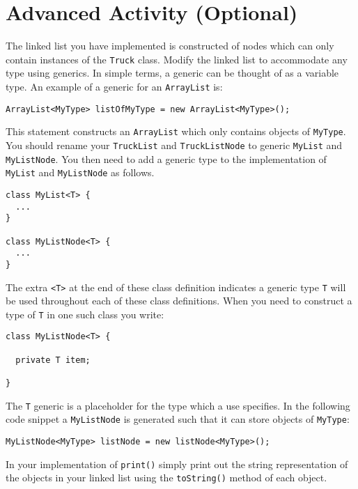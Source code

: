 \documentclass[12pt]{scrartcl}
\begin{document}
\section*{Advanced Activity (Optional)}

The linked list you have implemented is constructed of nodes which 
can only contain instances of the \texttt{Truck} class. 
Modify the linked list to accommodate any type using generics. In 
simple terms, a generic can be thought of as a variable type. An 
example of a generic for an \texttt{ArrayList} is:

\texttt{ArrayList<MyType> listOfMyType = new ArrayList<MyType>();}

This statement constructs an \texttt{ArrayList} which 
only contains objects of \texttt{MyType}. You should 
rename your \texttt{TruckList} and \texttt{TruckListNode} 
to generic \texttt{MyList} and \texttt{MyListNode}.  
You then need to add a generic type to the implementation of 
\texttt{MyList} and \texttt{MyListNode} as follows.

\begin{verbatim}
class MyList<T> { 
  ... 
}

class MyListNode<T> { 
  ... 
}
\end{verbatim}

The extra \texttt{<T>} at the end of these class definition 
indicates a generic type \texttt{T} will be used throughout 
each of these class definitions. When you need to construct a type of 
\texttt{T} in one such class you write:

\begin{verbatim}
class MyListNode<T> {

  private T item;

}
\end{verbatim}

The \texttt{T} generic is a placeholder for the type which 
a use specifies. In the following code snippet a 
\texttt{MyListNode} is generated such that it can store 
objects of \texttt{MyType}:

\texttt{MyListNode<MyType> listNode = new listNode<MyType>();}

In your implementation of \texttt{print()} simply print 
out the string representation of the objects in your linked list 
using the \texttt{toString()} method of each object.
\end{document}
